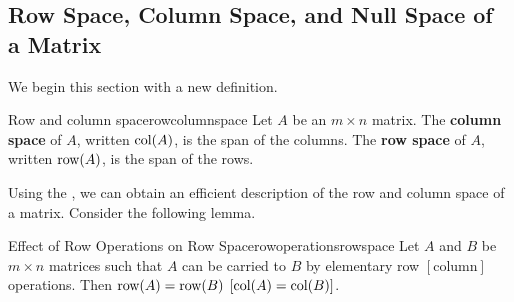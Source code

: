\subsection{Row Space, Column Space, and Null Space of a Matrix}

We begin this section with a new definition.

\begin{definition}{Row and column space}{rowcolumnspace}
Let $A$ be an $m\times n$ matrix. The \textbf{column space} of $A$, written $\mbox{col}(A)$, is the
span of the columns. The \textbf{row space} of $A$, written $\mbox{row}(A)$, is the span of the rows.
\end{definition}

Using the {\rref}, we can obtain an efficient description of the row and column space of
a matrix. Consider the following lemma.

\begin{lemma}{Effect of Row Operations on Row Space}{rowoperationsrowspace}
Let $A$ and $B$ be $m\times n$ matrices such that $A$ can be carried to $B$ by elementary row $\left[ \mbox{column} \right]$ operations. Then $\mbox{row}(A)=\mbox{row}(B)$ $\left[\mbox{col}(A)=\mbox{col}(B) \right]$.
\end{lemma}

